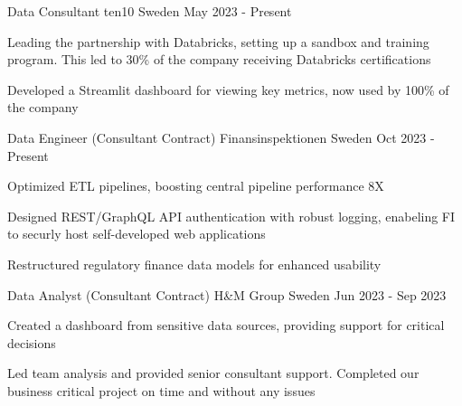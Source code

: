 

\begin{cventries}

  \cventry
    {Data Consultant} %
    {ten10} %
    {Sweden} %
    {May 2023 - Present} %
    {
      \begin{cvitems} %
        \item {Leading the partnership with Databricks, setting up a sandbox and training program. This led to 30\% of the company receiving Databricks certifications}
        \item {Developed a Streamlit dashboard for viewing key metrics, now used by 100\% of the company}
      \end{cvitems}
    }

  \cventry
    {Data Engineer (Consultant Contract)} %
    {Finansinspektionen} %
    {Sweden} %
    {Oct 2023 - Present} %
    {
      \begin{cvitems} %
        \item {Optimized ETL pipelines, boosting central pipeline performance 8X}
        \item {Designed REST/GraphQL API authentication with robust logging, enabeling FI to securly host self-developed web applications}
        \item {Restructured regulatory finance data models for enhanced usability}
      \end{cvitems}
    }

  \cventry
    {Data Analyst (Consultant Contract)} %
    {H\&M Group} %
    {Sweden} %
    {Jun 2023 - Sep 2023} %
    {
      \begin{cvitems} %
        \item {Created a dashboard from sensitive data sources, providing support for critical decisions}
        \item {Led team analysis and provided senior consultant support. Completed our business critical project on time and without any issues}
      \end{cvitems}
    }


\end{cventries}
